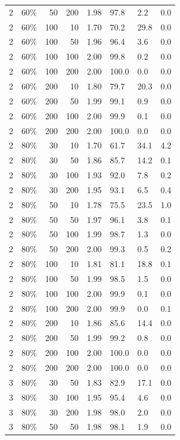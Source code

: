 \begin{table}[ht]
\begin{tabular}{rlrrllll}
  2 & 60\% & 50 & 200 & 1.98 & 97.8 & 2.2 & 0.0 \\ 
  2 & 60\% & 100 & 10 & 1.70 & 70.2 & 29.8 & 0.0 \\ 
  2 & 60\% & 100 & 50 & 1.96 & 96.4 & 3.6 & 0.0 \\ 
  2 & 60\% & 100 & 100 & 2.00 & 99.8 & 0.2 & 0.0 \\ 
  2 & 60\% & 100 & 200 & 2.00 & 100.0 & 0.0 & 0.0 \\ 
  2 & 60\% & 200 & 10 & 1.80 & 79.7 & 20.3 & 0.0 \\ 
  2 & 60\% & 200 & 50 & 1.99 & 99.1 & 0.9 & 0.0 \\ 
  2 & 60\% & 200 & 100 & 2.00 & 99.9 & 0.1 & 0.0 \\ 
  2 & 60\% & 200 & 200 & 2.00 & 100.0 & 0.0 & 0.0 \\ 
  2 & 80\% & 30 & 10 & 1.70 & 61.7 & 34.1 & 4.2 \\ 
  2 & 80\% & 30 & 50 & 1.86 & 85.7 & 14.2 & 0.1 \\ 
  2 & 80\% & 30 & 100 & 1.93 & 92.0 & 7.8 & 0.2 \\ 
  2 & 80\% & 30 & 200 & 1.95 & 93.1 & 6.5 & 0.4 \\ 
  2 & 80\% & 50 & 10 & 1.78 & 75.5 & 23.5 & 1.0 \\ 
  2 & 80\% & 50 & 50 & 1.97 & 96.1 & 3.8 & 0.1 \\ 
  2 & 80\% & 50 & 100 & 1.99 & 98.7 & 1.3 & 0.0 \\ 
  2 & 80\% & 50 & 200 & 2.00 & 99.3 & 0.5 & 0.2 \\ 
  2 & 80\% & 100 & 10 & 1.81 & 81.1 & 18.8 & 0.1 \\ 
  2 & 80\% & 100 & 50 & 1.99 & 98.5 & 1.5 & 0.0 \\ 
  2 & 80\% & 100 & 100 & 2.00 & 99.9 & 0.1 & 0.0 \\ 
  2 & 80\% & 100 & 200 & 2.00 & 99.9 & 0.0 & 0.1 \\ 
  2 & 80\% & 200 & 10 & 1.86 & 85.6 & 14.4 & 0.0 \\ 
  2 & 80\% & 200 & 50 & 1.99 & 99.2 & 0.8 & 0.0 \\ 
  2 & 80\% & 200 & 100 & 2.00 & 100.0 & 0.0 & 0.0 \\ 
  2 & 80\% & 200 & 200 & 2.00 & 100.0 & 0.0 & 0.0 \\ 
  3 & 80\% & 30 & 50 & 1.83 & 82.9 & 17.1 & 0.0 \\ 
  3 & 80\% & 30 & 100 & 1.95 & 95.4 & 4.6 & 0.0 \\ 
  3 & 80\% & 30 & 200 & 1.98 & 98.0 & 2.0 & 0.0 \\ 
  3 & 80\% & 50 & 50 & 1.98 & 98.1 & 1.9 & 0.0 \\ 

\end{tabular}
\end{table}
